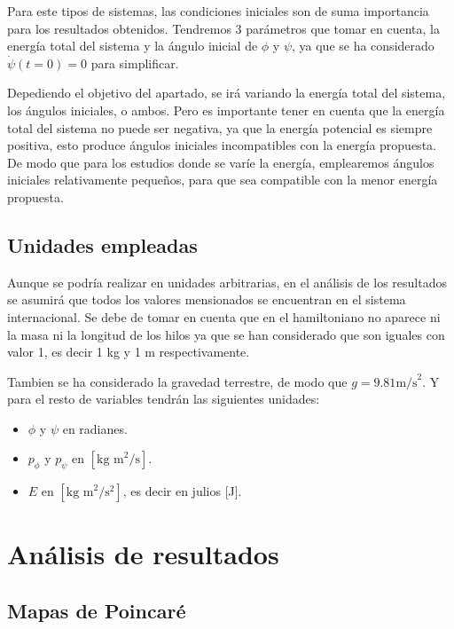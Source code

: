 \documentclass[11pt, twoside]{article} %
\begin{document}
Para este tipos de sistemas, las condiciones iniciales son de suma 
importancia para los resultados obtenidos. Tendremos 3 parámetros que tomar
en cuenta, la energía total del sistema y la ángulo inicial de $\phi$ y
$\psi$, ya que se ha considerado $\dot{\psi} (t=0) = 0$ para simplificar.

Depediendo el objetivo del apartado, se irá variando la energía total 
del sistema, los ángulos iniciales, o ambos. Pero es importante tener en
cuenta que la energía total del sistema no puede ser negativa, ya que
la energía potencial es siempre positiva, esto produce ángulos iniciales
incompatibles con la energía propuesta. De modo que para los estudios donde
se varíe la energía, emplearemos ángulos iniciales relativamente pequeños, 
para que sea compatible con la menor energía propuesta.

\subsection{Unidades empleadas}

Aunque se podría realizar en unidades arbitrarias, en el análisis 
de los resultados se asumirá que todos los valores mensionados se 
encuentran en el sistema internacional. Se debe de tomar en cuenta que 
en el hamiltoniano no aparece ni la masa ni la longitud de los hilos 
ya que se han considerado que son iguales con valor 1, es decir 1 kg y 
1 m respectivamente. 

Tambien se ha considerado la gravedad terrestre, de modo que 
$g = 9.81 \text{m/s}^2$. Y para el resto de variables tendrán las 
siguientes unidades:

\begin{itemize}
    \item $\phi$ y $\psi$ en radianes.
    \item $p_\phi$ y $p_\psi$ en $[\text{kg m}^2/\text{s}]$.
    \item $E$ en $[\text{kg m}^2/\text{s}^2]$, es decir en julios [J].
\end{itemize}


\newpage
\section{Análisis de resultados}

\subsection{Mapas de Poincaré}
\end{document}
